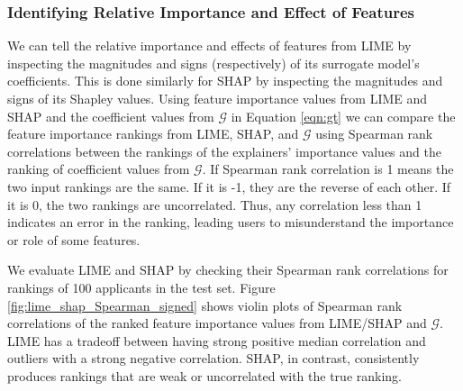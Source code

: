 \documentclass[11pt]{article}    %
\begin{document}



                    \subsubsection{Identifying Relative Importance and Effect of Features}
                        \label{sec:relative_importance}
 We can tell the relative importance and effects of features from LIME by inspecting the magnitudes and signs (respectively) of its surrogate model's coefficients. This is done similarly for SHAP by inspecting the magnitudes and signs of its Shapley values. Using feature importance values from LIME and SHAP and the coefficient values from $\mathcal{G}$ in Equation \ref{eqn:gt} we can compare the feature importance rankings from LIME, SHAP, and $\mathcal{G}$ using Spearman rank correlations \citep{MyersJeromeL2010Rdas} between the rankings of the explainers' importance values and the ranking of coefficient values from $\mathcal{G}$.  If Spearman rank correlation is 1 means the two input rankings are the same. If it is -1, they are the reverse of each other. If it is 0, the two rankings are uncorrelated. Thus, any correlation less than 1 indicates an error in the ranking, leading users to misunderstand the importance or role of some features. 
 
                        
        We evaluate LIME and SHAP by checking their Spearman rank correlations for rankings of 100 applicants in the test set. Figure \ref{fig:lime_shap_Spearman_signed} shows violin plots of Spearman rank correlations of the ranked feature importance values from LIME/SHAP and $\mathcal{G}$. LIME has a tradeoff between having strong positive median correlation and outliers with a strong negative correlation. SHAP, in contrast, consistently produces rankings that are weak or uncorrelated with the true ranking.
                        
\end{document}
